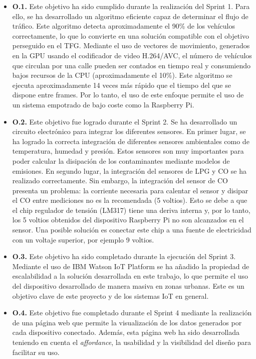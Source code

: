 \begin{itemize}
	\item \textbf{O.1.} Este objetivo ha sido cumplido durante la realización del Sprint 1. Para ello, se ha desarrollado un algoritmo eficiente capaz de determinar el flujo de tráfico. Este algoritmo detecta aproximadamente el 90\% de los vehículos correctamente, lo que lo convierte en una solución compatible con el objetivo perseguido en el \ac{TFG}. Mediante el uso de vectores de movimiento, generados en la \ac{GPU} usando el codificador de video H.264/AVC, el número de vehículos que circulan por una calle pueden ser contados en tiempo real y consumiendo bajos recursos de la \ac{CPU} (aproximadamente el 10\%). Este algoritmo se ejecuta aproximadamente 14 veces más rápido que el tiempo del que se dispone entre frames. Por lo tanto, el uso de este enfoque permite el uso de un sistema empotrado de bajo coste como la Raspberry Pi.
	
	\item \textbf{O.2.} Este objetivo fue logrado durante el Sprint 2. Se ha desarrollado un circuito electrónico para integrar los diferentes sensores. En primer lugar, se ha logrado la correcta integración de diferentes sensores ambientales como de temperatura, humedad y presión. Estos sensores son muy importantes para poder calcular la disipación de los contaminantes mediante modelos de emisiones. En segundo lugar, la integración del sensores de LPG y CO se ha realizado correctamente. Sin embargo, la integración del sensor de CO presenta un problema: la corriente necesaria para calentar el sensor y disipar el CO entre mediciones no es la recomendada (5 voltios). Esto se debe a que el chip regulador de tensión (LM317) tiene una deriva interna y, por lo tanto, los 5 voltios obtenidos del dispositivo Raspberry Pi no son alcanzados en el sensor. Una posible solución es conectar este chip a una fuente de electricidad con un voltaje superior, por ejemplo 9 voltios. 
	
	\item \textbf{O.3.} Este objetivo ha sido completado durante la ejecución del Sprint 3. Mediante el uso de IBM Watson IoT Platform se ha añadido la propiedad de escalabilidad a la solución desarrollada en este trabajo, lo que permite el uso del dispositivo desarrollado de manera masiva en zonas urbanas. Este es un objetivo clave de este proyecto y de los sistemas \ac{IoT} en general.
	
	\item \textbf{O.4.} Este objetivo fue completado durante el Sprint 4 mediante la realización de una página web que permite la visualización de los datos generados por cada dispositivo conectado. Además, esta página web ha sido desarrollada teniendo en cuenta el \textit{affordance}, la usabilidad y la visibilidad del diseño para facilitar su uso.
\end{itemize}


